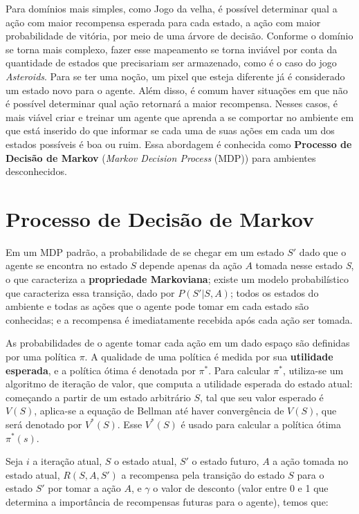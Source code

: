 Para domínios mais simples, como Jogo da velha, é possível determinar qual a ação com maior recompensa esperada para cada estado, a ação com maior probabilidade de vitória, por meio de uma árvore de decisão.
Conforme o domínio se torna mais complexo, fazer esse mapeamento se torna inviável por conta da quantidade de estados que precisariam ser armazenado, como é o caso do jogo \textit{Asteroids}.
Para se ter uma noção, um pixel que esteja diferente já é considerado um estado novo para o agente.
Além disso, é comum haver situações em que não é possível determinar qual ação retornará a maior recompensa.
Nesses casos, é mais viável criar e treinar um agente que aprenda a se comportar no ambiente em que está inserido do que informar se cada uma de suas ações em cada um dos estados possíveis é boa ou ruim.
Essa abordagem é conhecida como \textbf{Processo de Decisão de Markov} (\textit{Markov Decision Process} (MDP)) para ambientes desconhecidos.


\section{Processo de Decisão de Markov}
\label{sec:mdp}

Em um MDP padrão, a probabilidade de se chegar em um estado $S'$ dado que o agente se encontra no estado $S$ depende apenas da ação $A$ tomada nesse estado \textit{S}, o que caracteriza a \textbf{propriedade Markoviana}; existe um modelo probabilístico que caracteriza essa transição, dado por $P(S'|S,A)$; todos os estados do ambiente e todas as ações que o agente pode tomar em cada estado são conhecidas; e a recompensa é imediatamente recebida após cada ação ser tomada.

As probabilidades de o agente tomar cada ação em um dado espaço são definidas por uma política $\pi$. A qualidade de uma política é medida por sua \textbf{utilidade esperada}, e a política ótima é denotada por $\pi^{*}$. Para calcular $\pi^{*}$, utiliza-se um algoritmo de iteração de valor, que computa a utilidade esperada do estado atual: começando a partir de um estado arbitrário $S$, tal que seu valor esperado é $V(S)$, aplica-se a equação de Bellman até haver convergência de $V(S)$, que será denotado por $V^{*}(S)$. Esse $V^{*}(S)$ é usado para calcular a política ótima $\pi^{*}(s)$.

Seja $i$ a iteração atual, $S$ o estado atual, $S'$ o estado futuro, $A$ a ação tomada no estado atual, $R(S,A,S')$ a recompensa pela transição do estado $S$ para o estado $S'$ por tomar a ação $A$, e $\gamma$ o valor de desconto (valor entre 0 e 1 que determina a importância de recompensas futuras para o agente), temos que:

